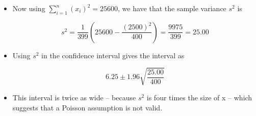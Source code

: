 \documentclass[a4paper,12pt]{article}
\begin{document}
\begin{enumerate}
\begin{itemize}
\item Now using $\sum^{n}_{i=1}(x_i)^2=25600$, we have that the sample variance $s^2$ is

\[  s^2 = \frac{1}{399} \left( 25600 - \frac{(2500)^2}{400} \right)  = \frac{9975}{399} = 25.00 \]

\item Using $s^2$ in the confidence interval gives the interval as

\[   6.25\pm 1.96 \sqrt{ \frac{25.00}{400} }\]

\item This interval is twice as wide – because $s^2$ is four times the size of x – which
suggests that a Poisson assumption is not valid.
\end{itemize}
\end{enumerate}
\end{document}
